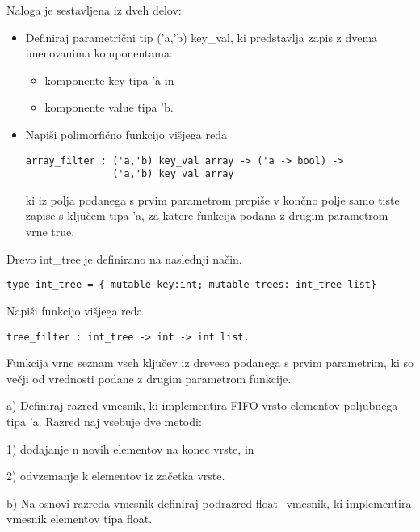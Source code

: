 \begin{ex}
  Naloga je sestavljena iz dveh delov:

\begin{itemize}
\item Definiraj parametri\v cni tip ('a,'b) key\_val, ki predstavlja
  zapis z dvema imenovanima komponentama:
  \begin{itemize}
  \item komponente key tipa 'a in
  \item komponente value tipa 'b.
  \end{itemize}
\item Napi\v si polimorfi\v cno funkcijo vi\v sjega reda

\begin{verbatim}
array_filter : ('a,'b) key_val array -> ('a -> bool) ->  
               ('a,'b) key_val array
\end{verbatim}

  ki iz polja podanega s prvim parametrom prepi\v se v kon\v cno polje
  samo tiste zapise s klju\v cem tipa 'a, za katere funkcija podana z
  drugim parametrom vrne true. \end{itemize}



\end{ex}
\begin{ex}
  Drevo int\_tree je definirano na naslednji na\v cin.

\begin{verbatim}
type int_tree = { mutable key:int; mutable trees: int_tree list}
\end{verbatim}

  Napi\v si funkcijo vi\v sjega reda

\begin{verbatim}
tree_filter : int_tree -> int -> int list.
\end{verbatim}

  Funkcija vrne seznam vseh klju\v cev iz drevesa podanega s prvim
  parametrim, ki so ve\v cji od vrednosti podane z drugim parametrom
  funkcije.


\end{ex} 
\begin{ex}
  a) Definiraj razred vmesnik, ki implementira FIFO vrsto elementov
  poljubnega tipa 'a. Razred naj vsebuje dve metodi:

  1) dodajanje n novih elementov na konec vrste, in
       
  2) odvzemanje k elementov iz za\v cetka vrste.

  b) Na osnovi razreda vmesnik definiraj podrazred float\_vmesnik, ki
  implementira vmesnik elementov tipa float.



\end{ex} 
